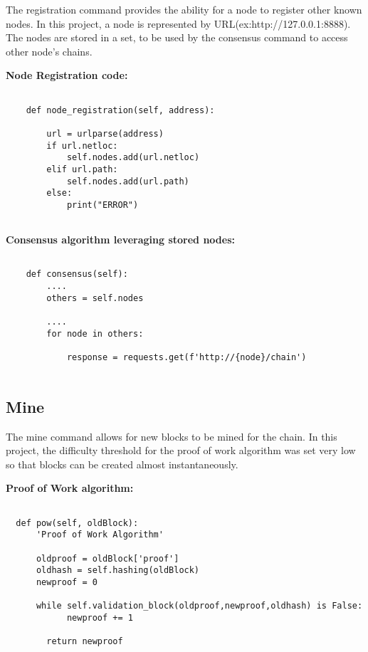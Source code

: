 The registration command provides the ability for a node to register other known nodes. In this project, a node is represented by URL(ex:http://127.0.0.1:8888). The nodes are stored in a set, to be used by the consensus command to access other node's chains.

\bigskip
\noindent
\textbf{Node Registration code:}
\begin{footnotesize}
\begin{verbatim}

    def node_registration(self, address):

        url = urlparse(address)
        if url.netloc:
            self.nodes.add(url.netloc)
        elif url.path:
            self.nodes.add(url.path)
        else:
            print("ERROR")
        
\end{verbatim}
\end{footnotesize}


\bigskip
\noindent
\textbf{Consensus algorithm leveraging stored nodes:}
\begin{footnotesize}
\begin{verbatim}

    def consensus(self):
        ....
        others = self.nodes
        
        ....
        for node in others:

            response = requests.get(f'http://{node}/chain')
        
\end{verbatim}
\end{footnotesize}

\subsection{Mine}

The mine command allows for new blocks to be mined for the chain. In this project, the difficulty threshold for the proof of work algorithm was set very low so that blocks can be created almost instantaneously. 

\bigskip
\noindent
\textbf{Proof of Work algorithm:}
\begin{footnotesize}
\begin{verbatim}

  def pow(self, oldBlock):
      'Proof of Work Algorithm'

      oldproof = oldBlock['proof']
      oldhash = self.hashing(oldBlock)
      newproof = 0

      while self.validation_block(oldproof,newproof,oldhash) is False:
            newproof += 1

        return newproof
        
\end{verbatim}
\end{footnotesize}

